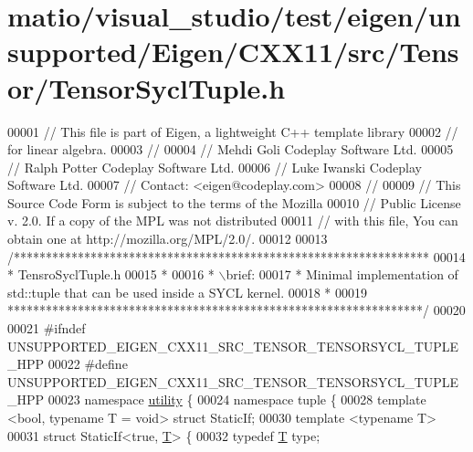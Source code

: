 \hypertarget{matio_2visual__studio_2test_2eigen_2unsupported_2_eigen_2_c_x_x11_2src_2_tensor_2_tensor_sycl_tuple_8h_source}{}\section{matio/visual\+\_\+studio/test/eigen/unsupported/\+Eigen/\+C\+X\+X11/src/\+Tensor/\+Tensor\+Sycl\+Tuple.h}
\label{matio_2visual__studio_2test_2eigen_2unsupported_2_eigen_2_c_x_x11_2src_2_tensor_2_tensor_sycl_tuple_8h_source}

\begin{DoxyCode}
00001 \textcolor{comment}{// This file is part of Eigen, a lightweight C++ template library}
00002 \textcolor{comment}{// for linear algebra.}
00003 \textcolor{comment}{//}
00004 \textcolor{comment}{// Mehdi Goli    Codeplay Software Ltd.}
00005 \textcolor{comment}{// Ralph Potter  Codeplay Software Ltd.}
00006 \textcolor{comment}{// Luke Iwanski  Codeplay Software Ltd.}
00007 \textcolor{comment}{// Contact: <eigen@codeplay.com>}
00008 \textcolor{comment}{//}
00009 \textcolor{comment}{// This Source Code Form is subject to the terms of the Mozilla}
00010 \textcolor{comment}{// Public License v. 2.0. If a copy of the MPL was not distributed}
00011 \textcolor{comment}{// with this file, You can obtain one at http://mozilla.org/MPL/2.0/.}
00012 
00013 \textcolor{comment}{/*****************************************************************}
00014 \textcolor{comment}{ * TensroSyclTuple.h}
00015 \textcolor{comment}{ *}
00016 \textcolor{comment}{ * \(\backslash\)brief:}
00017 \textcolor{comment}{ *  Minimal implementation of std::tuple that can be used inside a SYCL kernel.}
00018 \textcolor{comment}{ *}
00019 \textcolor{comment}{*****************************************************************/}
00020 
00021 \textcolor{preprocessor}{#ifndef UNSUPPORTED\_EIGEN\_CXX11\_SRC\_TENSOR\_TENSORSYCL\_TUPLE\_HPP}
00022 \textcolor{preprocessor}{#define UNSUPPORTED\_EIGEN\_CXX11\_SRC\_TENSOR\_TENSORSYCL\_TUPLE\_HPP}
00023 \textcolor{keyword}{namespace }\hyperlink{namespaceutility}{utility} \{
00024 \textcolor{keyword}{namespace }tuple \{
00028 \textcolor{keyword}{template} <\textcolor{keywordtype}{bool}, \textcolor{keyword}{typename} T = \textcolor{keywordtype}{void}> \textcolor{keyword}{struct }StaticIf;
00030 \textcolor{keyword}{template} <\textcolor{keyword}{typename} T>
00031 \textcolor{keyword}{struct }StaticIf<true, \hyperlink{group___sparse_core___module_class_eigen_1_1_triplet}{T}> \{
00032   \textcolor{keyword}{typedef} \hyperlink{group___sparse_core___module_class_eigen_1_1_triplet}{T} type;

\end{DoxyCode}
